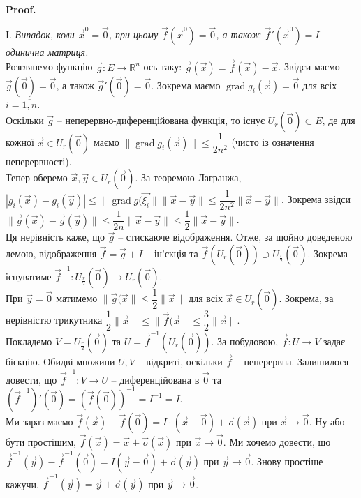 \documentclass[a4paper, 10pt]{article}
\makeatletter
\DeclareMathOperator{\wordgrad}{grad}
\theoremstyle{theoremdd}
\theoremstyle{theoremdd}
\theoremstyle{theoremdd}
\theoremstyle{theoremdd}
\theoremstyle{theoremdd}
\theoremstyle{theoremdd}
\theoremstyle{theoremdd}
\theoremstyle{theoremdd}
\theoremstyle{theoremdd}
\renewenvironment{proof}[1][Proof.\\]{\par
\pushQED{\hfill \qed}%
\normalfont \topsep6\p@\@plus6\p@\relax
\trivlist
\item\relax
{\bfseries
#1\@addpunct{.}}\hspace\labelsep\ignorespaces
}{%
\popQED\endtrivlist\@endpefalse
}
\makeatother
\begin{document}
\begin{proof}
I. \textit{Випадок, коли $\vec{x}^0 = \vec{0}$, при цьому $\vec{f}(\vec{x}^0) = \vec{0}$, а також $\vec{f}'(\vec{x}^0) = I$ -- одинична матриця.}\\
Розглянемо функцію $\vec{g} \colon E \to \mathbb{R}^n$ ось таку: $\vec{g}(\vec{x}) = \vec{f}(\vec{x}) - \vec{x}$. Звідси маємо $\vec{g}(\vec{0}) = \vec{0}$, а також $\vec{g}'(\vec{0}) = \vec{0}$. Зокрема маємо $\wordgrad g_i(\vec{x}) = \vec{0}$ для всіх $i = \overline{1,n}$.\\
Оскільки $\vec{g}$ -- неперервно-диференційована функція, то існує $U_r(\vec{0}) \subset E$, де для кожної $\vec{x} \in U_r(\vec{0})$ маємо $\|\wordgrad g_i(\vec{x})\| \leq \dfrac{1}{2n^2}$ (чисто із означення неперервності).\\
Тепер оберемо $\vec{x},\vec{y} \in U_r(\vec{0})$. За теоремою Лагранжа, $|g_i(\vec{x}) - g_i(\vec{y})| \leq \|\wordgrad g(\vec{\xi_i}\| \|\vec{x} - \vec{y}\| \leq \dfrac{1}{2n^2} \| \vec{x} - \vec{y}\|$. Зокрема звідси $\|\vec{g}(\vec{x}) - \vec{g}(\vec{y})\| \leq \dfrac{1}{2n} \|\vec{x} - \vec{y}\| \leq \dfrac{1}{2} \|\vec{x} - \vec{y}\|$.\\
Ця нерівність каже, що $\vec{g}$ --  стискаюче відображення. Отже, за щойно доведеною лемою, відображення $\vec{f} = \vec{g} + I$ -- ін'єкція та $\vec{f}(U_r(\vec{0})) \supset U_{\frac{r}{2}}(\vec{0})$. Зокрема існуватиме $\vec{f}^{-1} \colon U_{\frac{r}{2}}(\vec{0}) \to U_r(\vec{0})$.\\
При $\vec{y} = \vec{0}$ матимемо $\| \vec{g}(\vec{x}\| \leq \dfrac{1}{2} \|\vec{x}\|$ для всіх $\vec{x} \in U_r(\vec{0})$. Зокрема, за нерівністю трикутника $\dfrac{1}{2} \|\vec{x}\| \leq \|\vec{f}(\vec{x}\| \leq \dfrac{3}{2}\|\vec{x}\|$.\\
Покладемо $V = U_{\frac{r}{2}}(\vec{0})$ та $U = \vec{f}^{-1}(U_r(\vec{0}))$. За побудовою, $\vec{f} \colon U \to V$ задає бієкцію. Обидві множини $U,V$ -- відкриті, оскільки $\vec{f}$ -- неперервна. Залишилося довести, що $\vec{f}^{-1} \colon V \to U$ -- диференційована в $\vec{0}$ та $(\vec{f}^{-1})'(\vec{0}) = (\vec{f}(\vec{0}))^{-1} = I^{-1} = I$.\\
Ми зараз маємо $\vec{f}(\vec{x}) - \vec{f}(\vec{0}) = I \cdot (\vec{x} - \vec{0}) + \vec{o}(\vec{x})$ при $\vec{x} \to \vec{0}$. Ну або бути простішим, $\vec{f}(\vec{x}) = \vec{x} + \vec{o}(\vec{x})$ при $\vec{x} \to \vec{0}$. Ми хочемо довести, що $\vec{f}^{-1}(\vec{y}) - \vec{f}^{-1}(\vec{0}) = I (\vec{y} - \vec{0}) + \vec{o}(\vec{y})$ при $\vec{y} \to \vec{0}$. Знову простіше кажучи, $\vec{f}^{-1}(\vec{y}) = \vec{y} + \vec{o}(\vec{y})$ при $\vec{y} \to \vec{0}$.\\

\end{proof}
\end{document}
